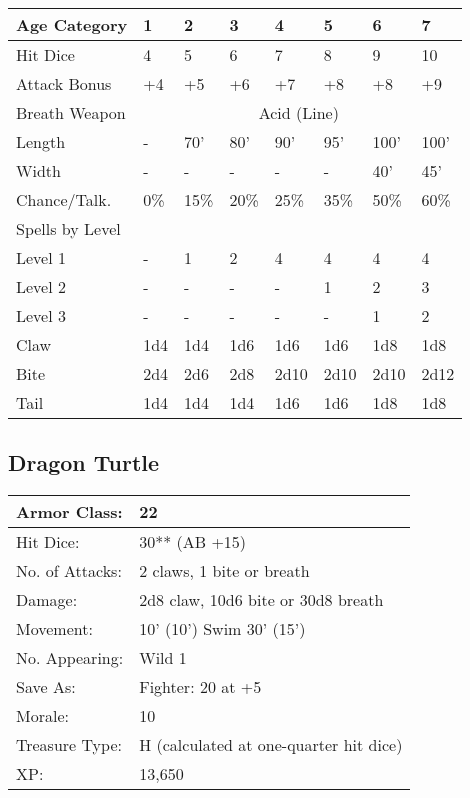 \documentclass[a4paper,twoside,openany,10pt]{book}
\begin{document}
\begin{multicols}{2}
\begin{center}
\begin{tabularx}{0.47\textwidth}{@{}lXXXXXXX@{}}
Age Category & 1 & 2 & 3 & 4 & 5 & 6 & 7 \\\hline
Hit Dice & 4 & 5 & 6 & 7 & 8 & 9 & 10 \\\hline
Attack Bonus & +4 & +5 & +6 & +7 & +8 & +8 & +9 \\\hline
Breath Weapon &  \multicolumn{7}{c}{Acid (Line)}\\\hline
Length & - & 70' & 80' & 90' & 95' & 100' & 100' \\\hline
Width & - & - & - & - & - & 40' & 45' \\\hline
Chance/Talk. & 0\% & 15\% & 20\% & 25\% & 35\% & 50\% & 60\% \\\hline
Spells by Level & & & & & & & \\\hline
Level 1 & - & 1 & 2 & 4 & 4 & 4 & 4 \\\hline
Level 2 & - & - & - & - & 1 & 2 & 3 \\\hline
Level 3 & - & - & - & - & - & 1 & 2 \\\hline
Claw & 1d4 & 1d4 & 1d6 & 1d6 & 1d6 & 1d8 & 1d8 \\\hline
Bite & 2d4 & 2d6 & 2d8 & 2d10 & 2d10 & 2d10 & 2d12 \\\hline
Tail & 1d4 & 1d4 & 1d4 & 1d6 & 1d6 & 1d8 & 1d8 \\\hline
\end{tabularx}
\end{center}

\subsection*{Dragon Turtle}\label{dragon-turtle}

\begin{tabularx}{0.48\textwidth}{@{}lX@{}}
Armor Class: & 22 \\\hline
Hit Dice: & 30** (AB +15) \\\hline
No. of Attacks: & 2 claws, 1 bite or breath \\\hline
Damage: & 2d8 claw, 10d6 bite or 30d8 breath \\\hline
Movement: & 10' (10') Swim
30' (15') \\\hline
No. Appearing: & Wild 1 \\\hline
Save As: & Fighter: 20 at +5 \\\hline
Morale: & 10 \\\hline
Treasure Type: & H (calculated at one-quarter hit dice) \\\hline
XP: & 13,650 \\\hline
\end{tabularx}\medskip


\end{multicols}
\end{document}

